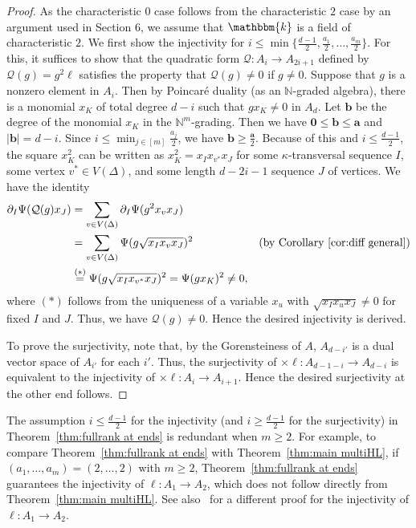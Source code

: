 \begin{proof}
As the characteristic $0$ case follows from the characteristic $2$ case by an argument used in Section 6, we assume that $\mathbbm{k}$ is a field of characteristic $2$.
We first show the injectivity for $i \leq \min \{ \frac{d-1}{2}, \frac{a_1}{2},\ldots,\frac{a_m}{2} \}$.
For this, it suffices to show that the quadratic form $\mathcal{Q}:A_i \rightarrow A_{2i+1}$ defined by $\mathcal{Q}(g)=g^2 \ell$ satisfies the property that $\mathcal{Q}(g) \neq 0$ if $g \neq 0$.
Suppose that $g$ is a nonzero element in $A_i$.
Then by Poincar\'{e} duality (as an $\mathbb{N}$-graded algebra), there is a monomial $x_K$ of total degree $d-i$ such that $gx_K \neq 0$ in $A_d$.
Let $\bm{b}$ be the degree of the monomial $x_K$ in the $\mathbb{N}^m$-grading.
Then we have $\bm{0} \leq \bm{b} \leq \bm{a}$ and $|\bm{b}|=d-i$. 
Since $i \leq \min_{j \in [m]} \frac{a_j}{2}$, we have $\bm{b} \geq \frac{\bm{a}}{2}$. 
Because of this and $i \leq \frac{d-1}{2}$, the square $x_K^2$ can be written as $x_K^2=x_Ix_{v^*}x_J$ for some $\kappa$-transversal sequence $I$, some vertex $v^* \in V(\Delta)$, and some length $d-2i-1$ sequence $J$ of vertices.
We have the identity
\begin{align*}
\partial_I\Psi(\mathcal{Q}(g)x_J) &= \sum_{v \in V(\Delta)} \partial_I\Psi(g^2x_vx_J) \\
&=\sum_{v \in V(\Delta)} \Psi(g\sqrt{x_Ix_vx_J})^2 & (\text{by Corollary~\ref{cor:diff general}})\\
&\overset{(*)}{=}\Psi(g\sqrt{x_Ix_{v^*}x_J})^2 = \Psi(gx_K)^2 \neq 0,
\end{align*}
where $(*)$ follows from the uniqueness of a variable $x_u$ with $\sqrt{x_Ix_ux_J} \neq 0$ for fixed $I$ and $J$. Thus, we have $\mathcal{Q}(g) \neq 0$. Hence the desired injectivity is derived.

To prove the surjectivity, note that, by the Gorensteiness of $A$, $A_{d-i'}$ is a dual vector space of $A_{i'}$ for each $i'$.
Thus, the surjectivity of $\times \ell:A_{d-1-i} \rightarrow A_{d-i}$ is equivalent to the injectivity of $\times \ell :A_{i} \rightarrow A_{i+1}$.
Hence the desired surjectivity at the other end follows.
\end{proof}
\begin{rema}
    The assumption $i \leq \frac{d-1}{2}$ for the injectivity (and $i \geq \frac{d-1}{2}$ for the surjectivity) in Theorem~\ref{thm:fullrank at ends} is redundant when $m \geq 2$.
    For example, to compare Theorem~\ref{thm:fullrank at ends} with Theorem~\ref{thm:main multiHL}, if $(a_1,\ldots,a_m)=(2,\ldots,2)$ with $m \geq 2$, Theorem~\ref{thm:fullrank at ends} guarantees the injectivity of $\ell:A_1 \rightarrow A_2$, which does not follow directly from Theorem~\ref{thm:main multiHL}.
    See also~\cite{Oba} for a different proof for the injectivity of $\ell:A_1 \rightarrow A_2$.
\end{rema}
